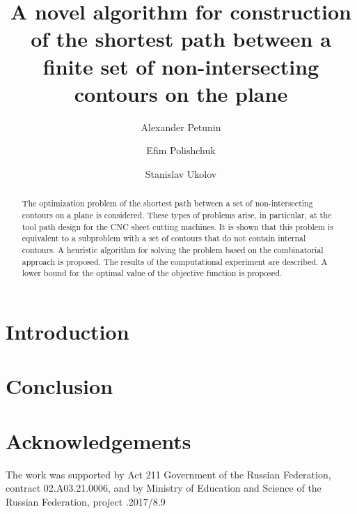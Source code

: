 \documentclass[runningheads]{llncs}
\begin{document}
\title{A novel algorithm for construction of the shortest path between a finite set of non-intersecting contours on the plane}


\author{
  Alexander	Petunin  
  \and
  Efim Polishchuk 
  \and
  Stanislav	Ukolov  
}

\maketitle              %

\begin{abstract}
The optimization problem of the shortest path
between a set of non-intersecting contours on a plane is considered.
These types of problems arise, in particular,
at the tool path design for the CNC sheet cutting machines.
It is shown that this problem is equivalent to a subproblem
with a set of contours that do not contain internal contours.
A heuristic algorithm for solving the problem based on the combinatorial approach is proposed.
The results of the computational experiment are described.
A lower bound for the optimal value of the objective function is proposed.

\end{abstract}

\section{Introduction}

\section{Conclusion}

\section*{Acknowledgements}

The work was supported by
Act 211 Government of the Russian Federation,
contract \textnumero 02.A03.21.0006,
and by Ministry of Education and Science
of the Russian Federation,
project .2017/8.9



\nocite{*}
\end{document}
